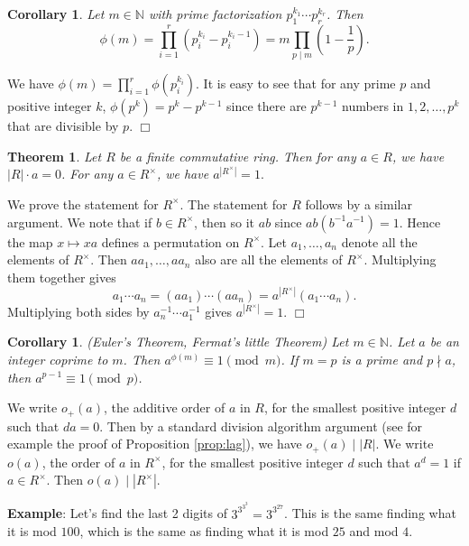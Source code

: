 \documentclass{article}
\def\N{{\mathbb N}}
\newtheorem{theorem}[subsection]{Theorem}
\newtheorem{cor}[subsection]{Corollary}
\newenvironment{proof}{\noindent {\bf Proof:}}{$\Box$ \vspace{2 ex}}
\begin{document}
\begin{cor}
    Let $m\in\N$ with prime factorization $p_1^{k_1}\cdots p_r^{k_r}$. Then $$\displaystyle\phi(m) = \prod_{i=1}^r\left(p_i^{k_i}-p_i^{k_i-1}\right)=m\prod_{p\mid m}\left(1-\frac{1}{p}\right).$$
\end{cor}

\begin{proof}
    We have $\phi(m) = \prod_{i=1}^r \phi(p_i^{k_i}).$ It is easy to see that for any prime $p$ and positive integer $k$, $\phi(p^k) = p^k - p^{k-1}$ since there are $p^{k-1}$ numbers in $1,2,\ldots,p^k$ that are divisible by $p$.
\end{proof}

\begin{theorem}
    Let $R$ be a finite commutative ring. Then for any $a\in R$, we have $|R|\cdot a = 0$. For any $a\in R^\times$, we have $a^{|R^\times|} = 1.$
\end{theorem}

\begin{proof}
    We prove the statement for $R^\times$. The statement for $R$ follows by a similar argument. We note that if $b\in R^\times$, then so it $ab$ since $ab(b^{-1}a^{-1}) = 1$. Hence the map $x\mapsto xa$ defines a permutation on $R^\times$. Let $a_1,\ldots,a_n$ denote all the elements of $R^\times$. Then $aa_1,\ldots,aa_n$ also are all the elements of $R^\times$. Multiplying them together gives
    $$a_1\cdots a_n = (aa_1)\cdots(aa_n) = a^{|R^\times|}(a_1\cdots a_n).$$
    Multiplying both sides by $a_n^{-1}\cdots a_1^{-1}$ gives $a^{|R^\times|} = 1.$
\end{proof}

\begin{cor}
    (Euler's Theorem, Fermat's little Theorem) Let $m\in\N$. Let $a$ be an integer coprime to $m$. Then $a^{\phi(m)}\equiv 1\pmod{m}$. If $m = p$ is a prime and $p\nmid a$, then $a^{p-1}\equiv 1\pmod{p}$.
\end{cor}

We write $o_+(a)$, the additive order of $a$ in $R$, for the smallest positive integer $d$ such that $da = 0$. Then by a standard division algorithm argument (see for example the proof of Proposition \ref{prop:lag}), we have $o_+(a)\mid |R|$. We write $o(a)$, the order of $a$ in $R^\times$, for the smallest positive integer $d$ such that $a^d = 1$ if $a\in R^\times$. Then $o(a)\mid |R^\times|$.


\vspace{3pt}
\noindent\textbf{Example}: Let's find the last 2 digits of $3^{3^{3^3}} = 3^{3^{27}}$. This is the same finding what it is mod $100$, which is the same as finding what it is mod $25$ and mod $4$.
\end{document}
